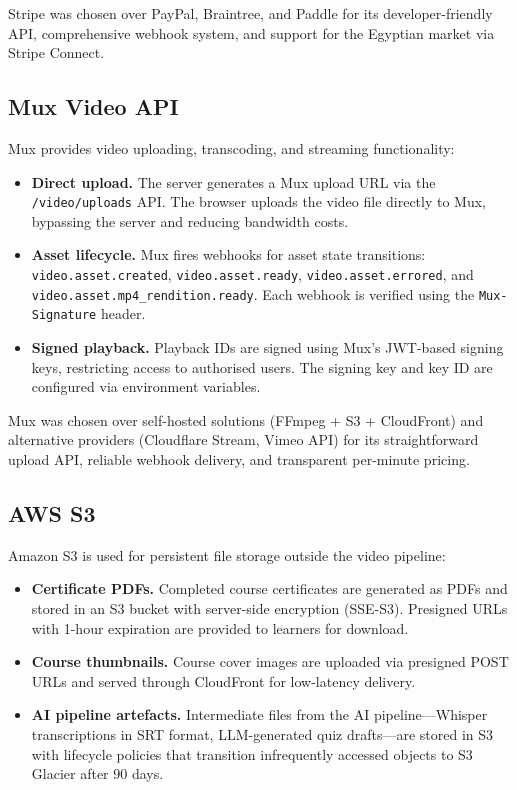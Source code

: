 Stripe was chosen over PayPal, Braintree, and Paddle for its developer-friendly API, comprehensive webhook system, and support for the Egyptian market via Stripe Connect.

\subsection{Mux Video API}
\label{subsec:app-mux}

Mux provides video uploading, transcoding, and streaming functionality:

\begin{itemize}
  \item \textbf{Direct upload.} The server generates a Mux upload URL via the \texttt{/video/uploads} API. The browser uploads the video file directly to Mux, bypassing the server and reducing bandwidth costs.
  \item \textbf{Asset lifecycle.} Mux fires webhooks for asset state transitions: \texttt{video.asset.created}, \texttt{video.asset.ready}, \texttt{video.asset.errored}, and \texttt{video.asset.mp4\_rendition.ready}. Each webhook is verified using the \texttt{Mux-Signature} header.
  \item \textbf{Signed playback.} Playback IDs are signed using Mux's JWT-based signing keys, restricting access to authorised users. The signing key and key ID are configured via environment variables.
\end{itemize}

Mux was chosen over self-hosted solutions (FFmpeg + S3 + CloudFront) and alternative providers (Cloudflare Stream, Vimeo API) for its straightforward upload API, reliable webhook delivery, and transparent per-minute pricing.

\subsection{AWS S3}
\label{subsec:app-s3}

Amazon S3 is used for persistent file storage outside the video pipeline:

\begin{itemize}
  \item \textbf{Certificate PDFs.} Completed course certificates are generated as PDFs and stored in an S3 bucket with server-side encryption (SSE-S3). Presigned URLs with 1-hour expiration are provided to learners for download.
  \item \textbf{Course thumbnails.} Course cover images are uploaded via presigned POST URLs and served through CloudFront for low-latency delivery.
  \item \textbf{AI pipeline artefacts.} Intermediate files from the AI pipeline---Whisper transcriptions in SRT format, LLM-generated quiz drafts---are stored in S3 with lifecycle policies that transition infrequently accessed objects to S3 Glacier after 90 days.
\end{itemize}

